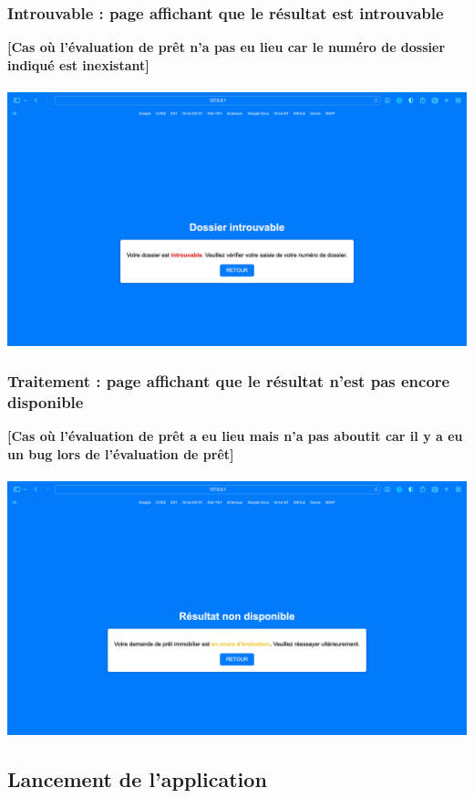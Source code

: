 \documentclass{article}
\begin{document}
    \subsubsection{Introuvable : page affichant que le résultat est introuvable}
    \textbf{[Cas où l'évaluation de prêt n'a pas eu lieu car le numéro de dossier indiqué est inexistant]} \\ \\
    \includegraphics[width=\textwidth]{Images/8.1/introuvable.png}
    
    \newpage
    
    \subsubsection{Traitement : page affichant que le résultat n'est pas encore disponible}
    \textbf{[Cas où l'évaluation de prêt a eu lieu mais n'a pas aboutit car il y a eu un bug lors de l'évaluation de prêt]} \\ \\
    \includegraphics[width=\textwidth]{Images/8.1/traitement.png}
    
    \subsection{Lancement de l'application}
\end{document}
